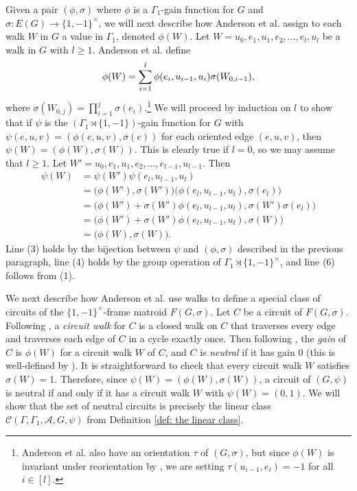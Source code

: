 \documentclass[12pt]{article}
\theoremstyle{definition}
\newcommand{\cA}{\mathcal{A}}
\newcommand{\cC}{\mathcal{C}}
\begin{document}
Given a pair $(\phi, \sigma)$ where $\phi$ is a $\Gamma_1$-gain function for $G$ and $\sigma \colon E(G) \to \{1, -1\}^{\times}$, we will next describe how Anderson et al. assign to each walk $W$ in $G$ a value in $\Gamma_1$, denoted $\phi(W)$.
Let $W = u_0,e_1,u_1,e_2,\dots,e_l,u_l$ be a walk in $G$ with $l \ge 1$.
Anderson et al. \cite[pg. 514, (2.1)]{Anderson-Su-Zaslavsky2024} define
\begin{align}
\setcounter{equation}{0}
\phi(W) = \sum_{i = 1}^{l}\phi(e_i, u_{i-1}, u_i)\sigma(W_{0,i-1}),
\end{align}
where $\sigma(W_{0,j}) = \prod_{i = 1}^{j}\sigma(e_i)$.\footnote{Anderson et al. also have an orientation $\tau$ of $(G, \sigma)$, but since $\phi(W)$ is invariant under reorientation by \cite[Lemma 2.5]{Anderson-Su-Zaslavsky2024}, we are setting $\tau(u_{i-1}, e_i) = -1$ for all $i \in [l]$.}
We will proceed by induction on $l$ to show that if $\psi$ is the $(\Gamma_1 \rtimes \{1,-1\})$-gain function for $G$ with $\psi(e, u, v) = (\phi(e, u, v), \sigma(e))$ for each oriented edge $(e, u, v)$, then $\psi(W) = (\phi(W), \sigma(W))$.
This is clearly true if $l = 0$, so we may assume that $l \ge 1$.
Let $W' = u_0,e_1,u_1,e_2,\dots,e_{l-1},u_{l-1}$.
Then
\begin{align}
\psi(W) &= \psi(W') \psi(e_l, u_{l-1}, u_l)\\
&= \big(\phi(W'), \sigma(W')\big)\big(\phi(e_l, u_{l-1}, u_l), \sigma(e_l)\big)\\
&= \big(\phi(W') + \sigma(W')\phi(e_l, u_{l-1}, u_l), \sigma(W')\sigma(e_l)\big) \\
&= \big(\phi(W') + \sigma(W')\phi(e_l, u_{l-1}, u_l), \sigma(W)\big) \\
&= \big(\phi(W), \sigma(W)\big).
\end{align}
Line (3) holds by the bijection between $\psi$ and $(\phi, \sigma)$ described in the previous paragraph, line (4) holds by the group operation of $\Gamma_1 \rtimes \{1, -1\}^{\times}$, and line (6) follows from (1).


We next describe how Anderson et al. use walks to define a special class of circuits of the $\{1,-1\}^{\times}$-frame matroid $F(G, \sigma)$.
Let $C$ be a circuit of $F(G, \sigma)$.
Following \cite[page 511]{Anderson-Su-Zaslavsky2024}, a \emph{circuit walk} for $C$ is a closed walk on $C$ that traverses every edge and traverses each edge of $C$ in a cycle exactly once.
Then following \cite[page 516]{Anderson-Su-Zaslavsky2024}, the \emph{gain} of $C$ is $\phi(W)$ for a circuit walk $W$ of $C$, and $C$ is \emph{neutral} if it has gain $0$ (this is well-defined by \cite[Proposition 2.8]{Anderson-Su-Zaslavsky2024}).
It is straightforward to check that every circuit walk $W$ satisfies $\sigma(W) = 1$.
Therefore, since $\psi(W) = (\phi(W), \sigma(W))$, a circuit of $(G, \psi)$ is neutral if and only if it has a circuit walk $W$ with $\psi(W) = (0,1)$.
We will show that the set of neutral circuits is precisely the linear class $\cC(\Gamma, \Gamma_1, \cA, G, \psi)$ from Definition \ref{def: the linear class}.
\end{document}
